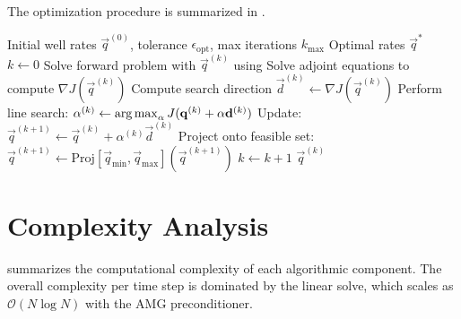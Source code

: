 The optimization procedure is summarized in .

\begin{algorithm}[htbp]
\caption{Gradient-Based Production Optimization}
\label{alg:optimization}
\begin{algorithmic}[1]
\Require Initial well rates $\vec{q}^{(0)}$, tolerance $\epsilon_{\text{opt}}$, max iterations $k_{\max}$
\Ensure Optimal rates $\vec{q}^*$
\State $k \gets 0$
    \State Solve forward problem with $\vec{q}^{(k)}$ using 
    \State Solve adjoint equations to compute $\nabla J(\vec{q}^{(k)})$
    \State Compute search direction $\vec{d}^{(k)} \gets \nabla J(\vec{q}^{(k)})$
    \State Perform line search: $\alpha^{(k)} \gets \operatorname{arg\,max}_{\alpha} J(\mathbf{q}^{(k)} + \alpha \mathbf{d}^{(k)})$
    \State Update: $\vec{q}^{(k+1)} \gets \vec{q}^{(k)} + \alpha^{(k)} \vec{d}^{(k)}$
    \State Project onto feasible set: $\vec{q}^{(k+1)} \gets \mathrm{Proj}[\vec{q}_{\min}, \vec{q}_{\max}](\vec{q}^{(k+1)})$
    \State $k \gets k + 1$
\EndWhile
\State \Return $\vec{q}^{(k)}$
\end{algorithmic}
\end{algorithm}

\section{Complexity Analysis}
\label{sec:methodology:complexity}

 summarizes the computational complexity of each algorithmic component. The overall complexity per time step is dominated by the linear solve, which scales as $\mathcal{O}(N \log N)$ with the AMG preconditioner.

